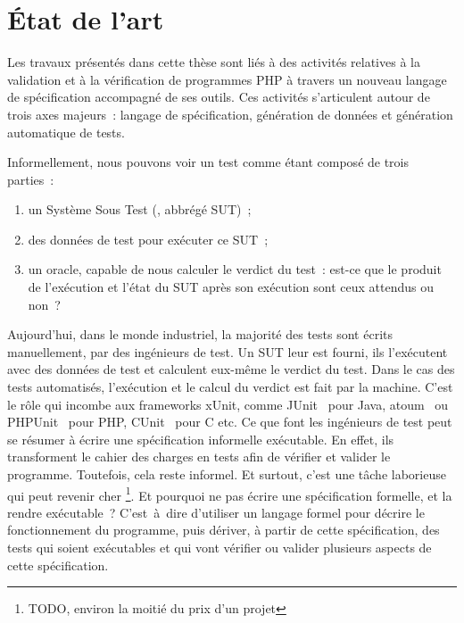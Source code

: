 \chapter{État de l'art}
\label{chapter:state}

\minitoc

Les travaux présentés dans cette thèse sont liés à des activités relatives à la
validation et à la vérification de programmes PHP à travers un nouveau langage
de spécification accompagné de ses outils. Ces activités s'articulent autour de
trois axes majeurs~: langage de spécification, génération de données et
génération automatique de tests.

Informellement, nous pouvons voir un test comme étant composé de trois parties~:

\begin{enumerate}

\item un Système Sous Test (, abbrégé {\strong
SUT})~;

\item des {\strong données de test} pour exécuter ce SUT~;

\item un {\strong oracle}, capable de nous calculer le verdict du test~: est-ce
que le produit de l'exécution et l'état du SUT après son exécution sont ceux
attendus ou non~?

\end{enumerate}

Aujourd'hui, dans le monde industriel, la majorité des tests sont écrits
{\strong manuellement}, par des ingénieurs de test. Un SUT leur est fourni, ils
l'exécutent avec des données de test et calculent eux-même le verdict du test.
Dans le cas des tests {\strong automatisés}, l'exécution et le calcul du verdict
est fait par la machine. C'est le rôle qui incombe aux frameworks xUnit, comme
JUnit~ pour Java, atoum~ ou PHPUnit~
pour PHP, CUnit~ pour C etc. Ce que font les ingénieurs de test
peut se résumer à écrire une spécification informelle exécutable. En effet, ils
transforment le cahier des charges en tests afin de vérifier et valider le
programme. Toutefois, cela reste informel. Et surtout, c'est une tâche
laborieuse qui peut revenir cher \footnote{TODO, environ la moitié du prix d'un
projet}. Et pourquoi ne pas écrire une spécification formelle, et la rendre
exécutable~?  C'est~à~dire d'utiliser un langage formel pour décrire le
fonctionnement du programme, puis dériver, à partir de cette spécification, des
tests qui soient exécutables et qui vont vérifier ou valider plusieurs aspects
de cette spécification. \\

